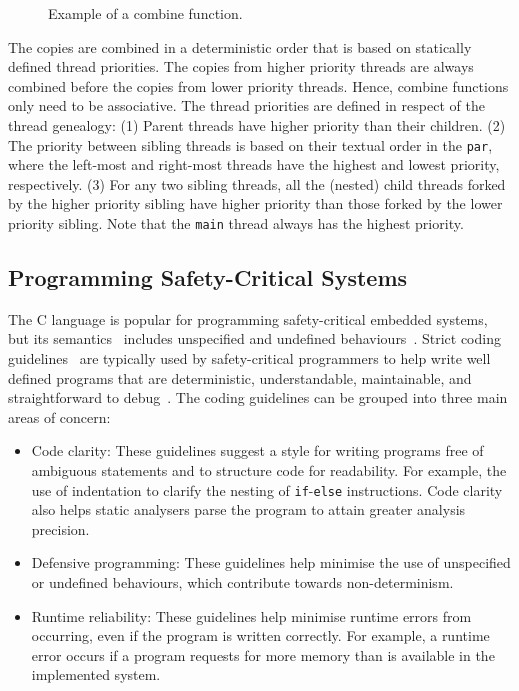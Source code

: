 \begin{figure}
	\centering
	
	\caption{Example of a combine function.}
	\label{fig:forec_combine}
\end{figure}

The copies are combined in a deterministic order that is based on statically defined 
thread priorities. The copies from higher priority threads are always combined before 
the copies from lower priority threads. Hence, combine functions only need to be associative. 
The thread priorities are defined in respect of the thread genealogy:
(1) Parent threads have higher priority than their children. (2) The priority between
sibling threads is based on their textual order in the \verb$par$, where the left-most 
and right-most threads have the highest and lowest priority, respectively. (3) For 
any two sibling threads, all the (nested) child threads forked by the higher priority
sibling have higher priority than those forked by the lower priority sibling. Note
that the \verb$main$ thread always has the highest priority.



\subsection{Programming Safety-Critical Systems}
\label{sec:forecLanguage_programming}
The C language is popular for programming safety-critical embedded systems, 
but its semantics~\cite{programming_languages_c} includes unspecified 
and undefined behaviours~\cite{programming_languages_c_pitfalls}. Strict 
coding guidelines~\cite{safety_critical_coding_misrac_standard,safety_critical_coding_power_10,safety_critical_coding_jpl} 
are typically used by safety-critical programmers to help write well 
defined programs that are deterministic, understandable, maintainable, 
and straightforward to debug~\cite{wcet_software_structure,safety_critical_coding_misrac_overview}. 
The coding guidelines can be grouped into three main areas of concern: 
\begin{itemize}
	\item Code clarity: These guidelines suggest a style for writing programs
		  free of ambiguous statements and to structure code for readability. 
		  For example, the use of indentation to clarify the nesting of 
		  \verb$if$-\verb$else$ instructions.
		  Code clarity also helps static analysers parse the program to 
		  attain greater analysis precision.
	\item Defensive programming: These guidelines help minimise the use of 
		  unspecified or undefined behaviours, which contribute towards
		  non-determinism.
	\item Runtime reliability: These guidelines help minimise runtime errors 
		  from occurring, even if the program is written correctly. 
		  For example, a runtime error occurs if a program requests for 
		  more memory than is available in the implemented system. 
\end{itemize}

